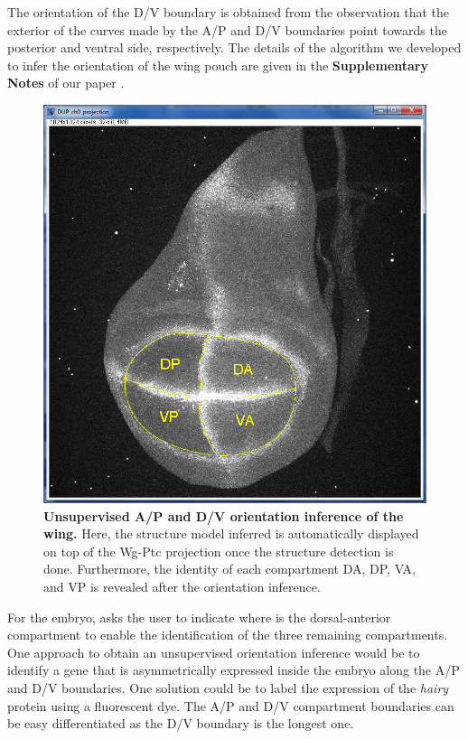 The orientation of the D/V boundary is obtained from the observation that the exterior of the curves made by the A/P and D/V boundaries point towards the posterior and ventral side, respectively. The details of the algorithm we developed to infer the orientation of the wing pouch are given in the \textbf{Supplementary Notes} of our paper \autocite{schaffter2013}.

\begin{figure}[!h]
\centering
\includegraphics[scale=0.35]{images/wingj_orientation.jpg}
\caption{\textbf{Unsupervised A/P and D/V orientation inference of the \droso wing.} Here, the structure model inferred is automatically displayed on top of the Wg-Ptc projection once the structure detection is done. Furthermore, the identity of each compartment DA, DP, VA, and VP is revealed after the orientation inference.}
\label{fig:wingj_orientation}
\end{figure}

For the \droso embryo, \wingj asks the user to indicate where is the dorsal-anterior compartment to enable the identification of the three remaining compartments. One approach to obtain an unsupervised orientation inference would be to identify a gene that is asymmetrically expressed inside the embryo along the A/P and D/V boundaries. One solution could be to label the expression of the \textit{hairy} protein using a fluorescent dye. The A/P and D/V compartment boundaries can be easy differentiated as the D/V boundary is the longest one.

